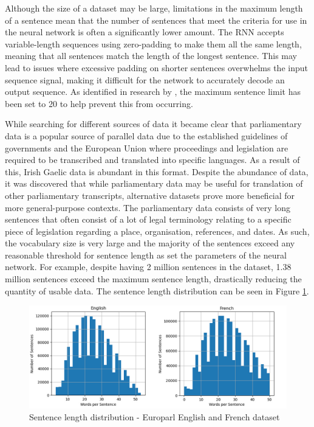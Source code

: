 Although the size of a dataset may be large, limitations in the maximum length of a sentence mean that the number of sentences that meet the criteria for use in the neural network is often a significantly lower amount. The RNN accepts variable-length sequences using zero-padding to make them all the same length, meaning that all sentences match the length of the longest sentence. This may lead to issues where excessive padding on shorter sentences overwhelms the input sequence signal, making it difficult for the network to accurately decode an output sequence. As identified in research by \cite{cho_properties_2014}, the maximum sentence limit has been set to 20 to help prevent this from occurring.

While searching for different sources of data it became clear that parliamentary data is a popular source of parallel data due to the established guidelines of governments and the European Union where proceedings and legislation are required to be transcribed and translated into specific languages. As a result of this, Irish Gaelic data is abundant in this format. Despite the abundance of data, it was discovered that while parliamentary data may be useful for translation of other parliamentary transcripts, alternative datasets prove more beneficial for more general-purpose contexts. The parliamentary data consists of very long sentences that often consist of a lot of legal terminology relating to a specific piece of legislation regarding a place, organisation, references, and dates. 
As such, the vocabulary size is very large and the majority of the sentences exceed any reasonable threshold for sentence length as set the parameters of the neural network. For example, despite having 2 million sentences in the \cite{french_corpus_2005} dataset, 1.38 million sentences exceed the maximum sentence length, drastically reducing the quantity of usable data. The sentence length distribution can be seen in Figure \ref{fig:sentence_length-french_legal}.

\begin{figure}[ht!]
\centering
\includegraphics[width=1\textwidth]{media/methodology/s_length-1-en_fr.jpg}
\captionsetup{justification=centering}
\caption[Diagram of the Europarl dataset sentence length distribution]{Sentence length distribution - Europarl English and French dataset} %
\label{fig:sentence_length-french_legal}
\end{figure}

